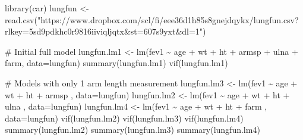\documentclass[
  letterpaper,
  DIV=11,
  numbers=noendperiod]{scrreprt}
\newenvironment{Shaded}{\begin{snugshade}}{\end{snugshade}}
\newcommand{\AttributeTok}[1]{\textcolor[rgb]{0.40,0.45,0.13}{#1}}
\newcommand{\CommentTok}[1]{\textcolor[rgb]{0.37,0.37,0.37}{#1}}
\newcommand{\FunctionTok}[1]{\textcolor[rgb]{0.28,0.35,0.67}{#1}}
\newcommand{\NormalTok}[1]{\textcolor[rgb]{0.00,0.23,0.31}{#1}}
\newcommand{\OtherTok}[1]{\textcolor[rgb]{0.00,0.23,0.31}{#1}}
\newcommand{\SpecialCharTok}[1]{\textcolor[rgb]{0.37,0.37,0.37}{#1}}
\newcommand{\StringTok}[1]{\textcolor[rgb]{0.13,0.47,0.30}{#1}}
\begin{document}
\begin{Shaded}
\begin{Highlighting}[]
\FunctionTok{library}\NormalTok{(car)}
\NormalTok{lungfun }\OtherTok{\textless{}{-}} \FunctionTok{read.csv}\NormalTok{(}\StringTok{"https://www.dropbox.com/scl/fi/eee36d1h85s8gnejdqykx/lungfun.csv?rlkey=5sd9pdkhc0r9816iiviqljqtx\&st=607s9yxt\&dl=1"}\NormalTok{)}

\CommentTok{\# Initial full model}
\NormalTok{lungfun.lm1 }\OtherTok{\textless{}{-}} \FunctionTok{lm}\NormalTok{(fev1 }\SpecialCharTok{\textasciitilde{}}\NormalTok{ age }\SpecialCharTok{+}\NormalTok{ wt }\SpecialCharTok{+}\NormalTok{ ht }\SpecialCharTok{+}\NormalTok{ armsp }\SpecialCharTok{+}\NormalTok{ ulna }\SpecialCharTok{+}\NormalTok{ farm, }\AttributeTok{data=}\NormalTok{lungfun)}
\FunctionTok{summary}\NormalTok{(lungfun.lm1)}
\FunctionTok{vif}\NormalTok{(lungfun.lm1)}

\CommentTok{\# Models with only 1 arm length measurement}
\NormalTok{lungfun.lm3 }\OtherTok{\textless{}{-}} \FunctionTok{lm}\NormalTok{(fev1 }\SpecialCharTok{\textasciitilde{}}\NormalTok{ age }\SpecialCharTok{+}\NormalTok{ wt }\SpecialCharTok{+}\NormalTok{ ht }\SpecialCharTok{+}\NormalTok{ armsp              , }\AttributeTok{data=}\NormalTok{lungfun)}
\NormalTok{lungfun.lm2 }\OtherTok{\textless{}{-}} \FunctionTok{lm}\NormalTok{(fev1 }\SpecialCharTok{\textasciitilde{}}\NormalTok{ age }\SpecialCharTok{+}\NormalTok{ wt }\SpecialCharTok{+}\NormalTok{ ht }\SpecialCharTok{+}\NormalTok{         ulna       , }\AttributeTok{data=}\NormalTok{lungfun)}
\NormalTok{lungfun.lm4 }\OtherTok{\textless{}{-}} \FunctionTok{lm}\NormalTok{(fev1 }\SpecialCharTok{\textasciitilde{}}\NormalTok{ age }\SpecialCharTok{+}\NormalTok{ wt }\SpecialCharTok{+}\NormalTok{ ht }\SpecialCharTok{+}\NormalTok{               farm , }\AttributeTok{data=}\NormalTok{lungfun)}
\FunctionTok{vif}\NormalTok{(lungfun.lm2)}
\FunctionTok{vif}\NormalTok{(lungfun.lm3)}
\FunctionTok{vif}\NormalTok{(lungfun.lm4)}
\FunctionTok{summary}\NormalTok{(lungfun.lm2)}
\FunctionTok{summary}\NormalTok{(lungfun.lm3)}
\FunctionTok{summary}\NormalTok{(lungfun.lm4)}


\end{Highlighting}
\end{Shaded}
\end{document}
